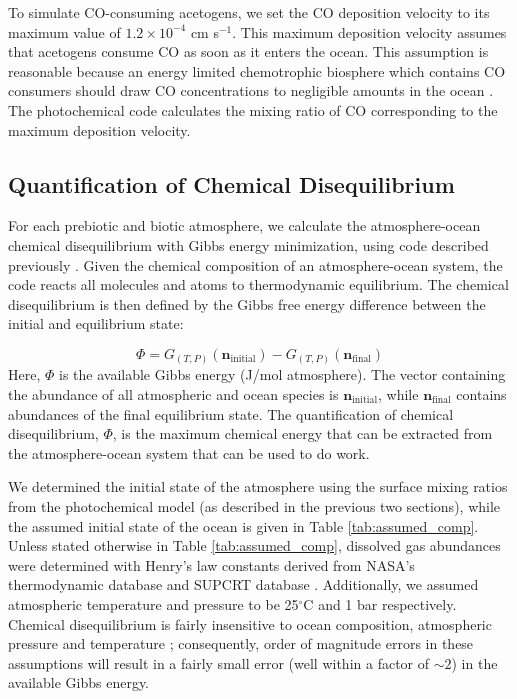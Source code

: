 To simulate CO-consuming acetogens, we set the CO deposition velocity to its maximum value of $1.2 \times 10^{-4}$ cm s$^{-1}$. This maximum deposition velocity assumes that acetogens consume CO as soon as it enters the ocean. This assumption is reasonable because an energy limited chemotrophic biosphere which contains CO consumers should draw CO concentrations to negligible amounts in the ocean \citep{Kharecha_2005,Schwieterman_2019}. The photochemical code calculates the mixing ratio of CO corresponding to the maximum deposition velocity.

\subsection{Quantification of Chemical Disequilibrium}

For each prebiotic and biotic atmosphere, we calculate the atmosphere-ocean chemical disequilibrium with Gibbs energy minimization, using code described previously \citep{KrissansenTotton_2018c}. Given the chemical composition of an atmosphere-ocean system, the code reacts all molecules and atoms to thermodynamic equilibrium. The chemical disequilibrium is then defined by the Gibbs free energy difference between the initial and equilibrium state:

\begin{equation}
  \Phi = G_{(T,P)} \left( \textbf{n}_\mathrm{initial} \right) - G_{(T,P)} \left( \textbf{n}_\mathrm{final} \right)
\end{equation}
Here, $\Phi$ is the available Gibbs energy (J/mol atmosphere). The vector containing the abundance of all atmospheric and ocean species is $\textbf{n}_\mathrm{initial}$, while $\textbf{n}_\mathrm{final}$ contains abundances of the final equilibrium state. The quantification of chemical disequilibrium, $\Phi$, is the maximum chemical energy that can be extracted from the atmosphere-ocean system that can be used to do work.

We determined the initial state of the atmosphere using the surface mixing ratios from the photochemical model (as described in the previous two sections), while the assumed initial state of the ocean is given in Table \ref{tab:assumed_comp}. Unless stated otherwise in Table \ref{tab:assumed_comp}, dissolved gas abundances were determined with Henry's law constants derived from NASA's thermodynamic database \citep{Burcat_2005} and SUPCRT database \citep{Johnson_1992}. Additionally, we assumed atmospheric temperature and pressure to be 25$^\circ$C and 1 bar respectively. Chemical disequilibrium is fairly insensitive to ocean composition, atmospheric pressure and temperature \citep{KrissansenTotton_2018c}; consequently, order of magnitude errors in these assumptions will result in a fairly small error (well within a factor of $\sim 2$) in the available Gibbs energy.

